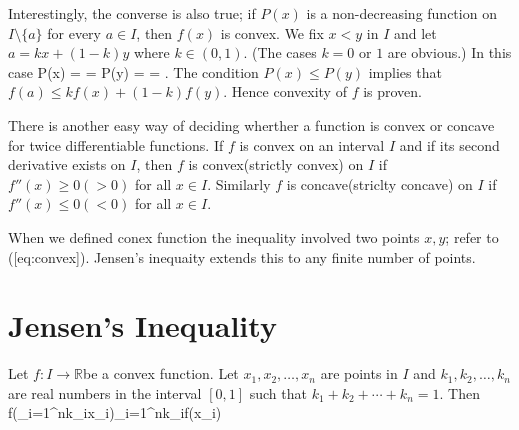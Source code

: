 Interestingly, the converse is also true; if $P(x)$ is a non-decreasing function on $I\setminus\{a\}$ for every $a\in I$, then
$f(x)$ is convex. We fix $x<y$ in $I$ and let $a = kx + (1 - k)y$ where $k\in(0,1)$. (The cases $k = 0$ or $1$ are obvious.) In
this case
\startformula P(x) =  = \stopformula
\startformula P(y) =  = .\stopformula
The condition $P(x)\leq P(y)$ implies that $f(a)\leq kf(x) + (1 - k)f(y).$ Hence convexity of $f$ is proven.

There is another easy way of deciding wherther a function is convex or concave for twice differentiable functions. If $f$ is convex
on an interval $I$ and if its second derivative exists on $I$, then $f$ is convex(strictly convex) on $I$ if $f''(x)\geq 0(> 0)$ for
all $x\in I$. Similarly $f$ is concave(striclty concave) on $I$ if $f''(x)\leq0(<0)$ for all $x\in I$.

When we defined conex function the inequality involved two points $x, y$; refer to ([eq:convex]). Jensen's inequaity extends
this to any finite number of points.

\section{Jensen's Inequality}
\starttheorem
  Let $f:I\rightarrow\mathbb{R}$be a convex function. Let $x_1, x_2, \ldots, x_n$ are points in $I$ and $k_1, k_2, \ldots, k_n$ are
  real numbers in the interval $[0, 1]$ such that $k_1 + k_2 + \cdots + k_n = 1$. Then
  \placeformula[eq:jensen]\startformula
    f\left(\sum_{i=1}^nk_ix_i\right)\leq\sum_{i=1}^nk_if(x_i)
  \stopformula
\stoptheorem

